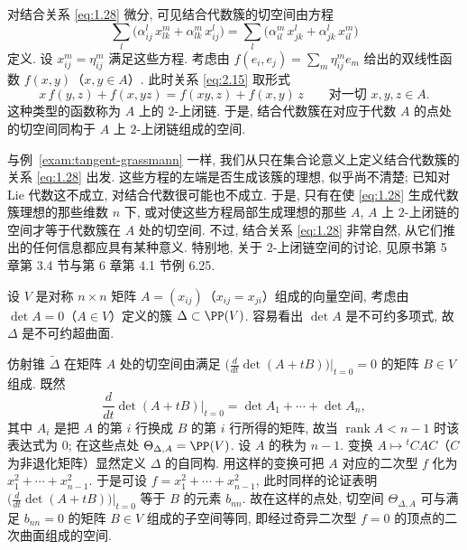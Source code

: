 \begin{example}[结合代数的簇]\label{exam:tangent-algebras}
	对结合关系 \eqref{eq:1.28} 微分, 可见结合代数簇的切空间由方程
	\begin{equation}
		\label{eq:2.15}
		\sum_l \bigl( \alpha_{ij}^l\, x_{lk}^m + \alpha_{lk}^m\, x_{ij}^l \bigr) = \sum_l \bigl( \alpha_{il}^m\, x_{jk}^l + \alpha_{jk}^l\, x_{il}^m \bigr)
	\end{equation}
	定义. 设 $x_{ij}^m = \eta_{ij}^m$ 满足这些方程. 考虑由 $f(e_i, e_j) = \sum_m \eta_{ij}^m e_m$ 给出的双线性函数 $f(x, y)$（$x, y \in A$）. 此时关系 \eqref{eq:2.15} 取形式
	\[
		x\, f(y, z) + f(x, yz) = f(xy, z) + f(x, y)\, z \qquad \text{对一切 } x, y, z \in A.
	\]
	这种类型的函数称为 $A$ 上的 $2$-上闭链. 于是, 结合代数簇在对应于代数 $A$ 的点处的切空间同构于 $A$ 上 $2$-上闭链组成的空间.

	与例~\ref{exam:tangent-grassmann} 一样, 我们从只在集合论意义上定义结合代数簇的关系 \eqref{eq:1.28} 出发. 这些方程的左端是否生成该簇的理想, 似乎尚不清楚; 已知对 Lie 代数这不成立, 对结合代数很可能也不成立. 于是, 只有在使 \eqref{eq:1.28} 生成代数簇理想的那些维数 $n$ 下, 或对使这些方程局部生成理想的那些 $A$, $A$ 上 $2$-上闭链的空间才等于代数簇在 $A$ 处的切空间. 不过, 结合关系 \eqref{eq:1.28} 非常自然, 从它们推出的任何信息都应具有某种意义. 特别地, 关于 $2$-上闭链空间的讨论, 见原书第 5 章第 3.4 节与第 6 章第 4.1 节例 6.25.
\end{example}

\begin{example}[二次曲面的簇]\label{exam:tangent-quadrics}
	设 $V$ 是对称 $n \times n$ 矩阵 $A = (x_{ij})$（$x_{ij} = x_{ji}$）组成的向量空间, 考虑由 $\det A = 0$（$A \in V$）定义的簇 $\Delta \subset \PP(V)$. 容易看出 $\det A$ 是不可约多项式, 故 $\Delta$ 是不可约超曲面.

 仿射锥 $\widetilde\Delta$ 在矩阵 $A$ 处的切空间由满足 $\bigl( \frac{d}{dt} \det(A + tB) \bigr)\big|_{t=0} = 0$ 的矩阵 $B \in V$ 组成. 既然
	\[
		\frac{d}{dt} \det(A + tB)\Big|_{t=0} = \det A_1 + \cdots + \det A_n,
	\]
	其中 $A_i$ 是把 $A$ 的第 $i$ 行换成 $B$ 的第 $i$ 行所得的矩阵, 故当 $\operatorname{rank} A < n-1$ 时该表达式为 $0$; 在这些点处 $\Theta_{\Delta,A} = \PP(V)$. 设 $A$ 的秩为 $n-1$. 变换 $A \mapsto {}^t C A C$（$C$ 为非退化矩阵）显然定义 $\Delta$ 的自同构. 用这样的变换可把 $A$ 对应的二次型 $f$ 化为 $x_1^2 + \cdots + x_{n-1}^2$. 于是可设 $f = x_1^2 + \cdots + x_{n-1}^2$, 此时同样的论证表明 $\bigl( \frac{d}{dt}\det(A + tB) \bigr)\big|_{t=0}$ 等于 $B$ 的元素 $b_{nn}$. 故在这样的点处, 切空间 $\Theta_{\Delta,A}$ 可与满足 $b_{nn} = 0$ 的矩阵 $B \in V$ 组成的子空间等同, 即经过奇异二次型 $f = 0$ 的顶点的二次曲面组成的空间.
\end{example}

